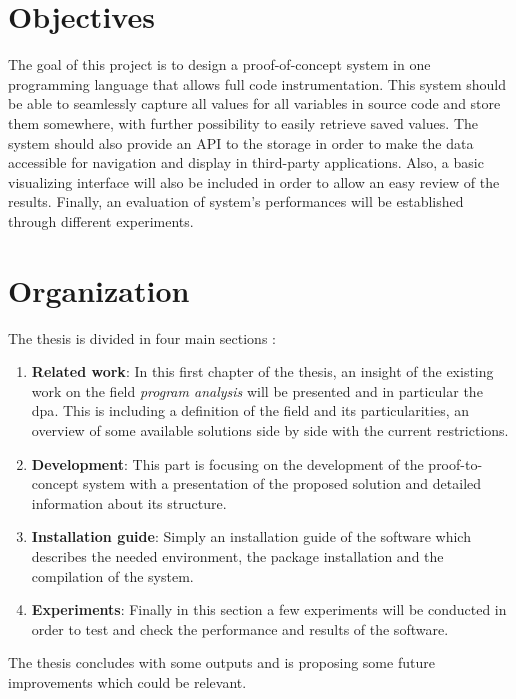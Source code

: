 \section{Objectives}
The goal of this project is to design a proof-of-concept system in one programming language that allows full code instrumentation. This system should be able to seamlessly capture all values for all variables in source code and store them somewhere, with further possibility to easily retrieve saved values. The system should also provide an API to the storage in order to make the data accessible for navigation and display in third-party applications. Also, a basic visualizing interface will also be included in order to allow an easy review of the results. Finally, an evaluation of system's performances will be established through different experiments.

\section{Organization}
The thesis is divided in four main sections :
\begin{enumerate}
  \item \textbf{Related work}: In this first chapter of the thesis, an insight of the existing work on the field \textit{program analysis} will be presented and in particular the \gls{dpa}. This is including a definition of the field and its particularities, an overview of some available solutions side by side with the current restrictions.
  \item \textbf{Development}: This part is focusing on the development of the proof-to-concept system with a presentation of the proposed solution and detailed information about its structure.
  \item \textbf{Installation guide}: Simply an installation guide of the software which describes the needed environment, the package installation and the compilation of the system.
  \item \textbf{Experiments}: Finally in this section a few experiments will be conducted in order to test and check the performance and results of the software.
\end{enumerate}
The thesis concludes with some outputs and is proposing some future improvements which could be relevant.
